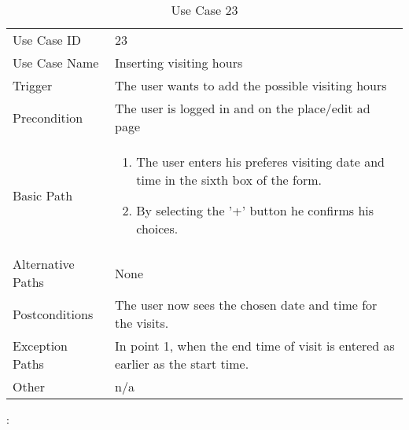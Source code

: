 \begin{table}[H]
\centering
\label{table-use-case-23}
\begin{tabular}{|p{3cm}|p{10cm}}
Use Case ID       & 23                                                      \\
Use Case Name     & Inserting visiting hours                            \\
Trigger           & The user wants to add the possible visiting hours \\
Precondition      & The user is logged in and on the place/edit ad page
\\
Basic Path        & \begin{enumerate}
\item		The user enters his preferes visiting date and time in the sixth box of
the form.
\item  		By selecting the '+' button he confirms his choices.
\end{enumerate} 
     \\
Alternative Paths & None                          \\
Postconditions    & The user now sees the chosen date and time for the visits.
\\
Exception Paths   & In point 1, when the end time of visit is entered as earlier
as the start time.
\\
Other             & n/a                                                                                                                                                                                                        
\end{tabular}
\caption{Use Case 23}:
\end{table}


